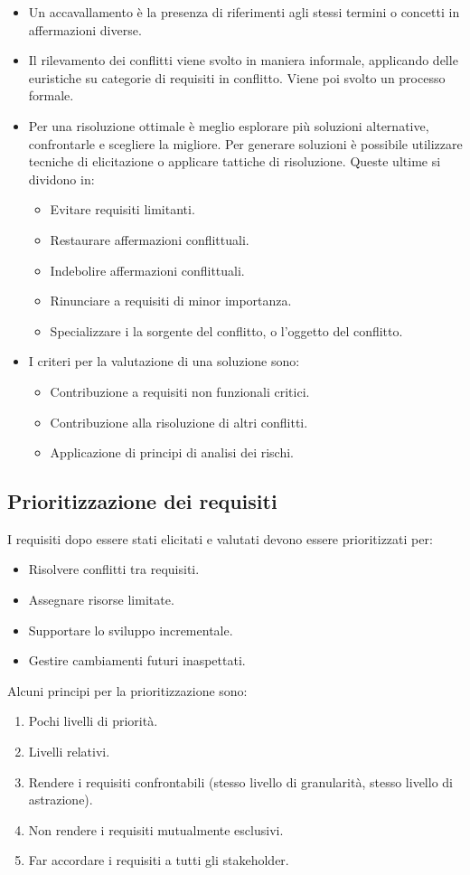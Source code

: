 \documentclass[../main.tex]{subfiles}
\begin{document}
\begin{itemize}
	\item Un accavallamento è la presenza di riferimenti agli stessi termini o concetti in affermazioni diverse.
	\item Il rilevamento dei conflitti viene svolto in maniera informale, applicando delle euristiche su categorie di requisiti in conflitto. Viene poi svolto un processo formale.
	\item Per una risoluzione ottimale è meglio esplorare più soluzioni alternative, confrontarle e scegliere la migliore.
	Per generare soluzioni è possibile utilizzare tecniche di elicitazione o applicare tattiche di risoluzione.
	Queste ultime si dividono in:
	\begin{itemize}
		\item Evitare requisiti limitanti.
		\item Restaurare affermazioni conflittuali.
		\item Indebolire affermazioni conflittuali.
		\item Rinunciare a requisiti di minor importanza.
		\item Specializzare i la sorgente del conflitto, o l'oggetto del conflitto.
	\end{itemize}
	\item I criteri per la valutazione di una soluzione sono:
	\begin{itemize}
		\item Contribuzione a requisiti non funzionali critici.
		\item Contribuzione alla risoluzione di altri conflitti.
		\item Applicazione di principi di analisi dei rischi.
	\end{itemize}
\end{itemize}
\subsection{Prioritizzazione dei requisiti}
I requisiti dopo essere stati elicitati e valutati devono essere prioritizzati per:
\begin{itemize}
	\item Risolvere conflitti tra requisiti.
	\item Assegnare risorse limitate.
	\item Supportare lo sviluppo incrementale.
	\item Gestire cambiamenti futuri inaspettati.
\end{itemize}
Alcuni principi per la prioritizzazione sono:
\begin{enumerate}
	\item Pochi livelli di priorità.
	\item Livelli relativi.
	\item Rendere i requisiti confrontabili (stesso livello di granularità, stesso livello di astrazione).
	\item Non rendere i requisiti mutualmente esclusivi.
	\item Far accordare i requisiti a tutti gli stakeholder.
\end{enumerate}
\end{document}
